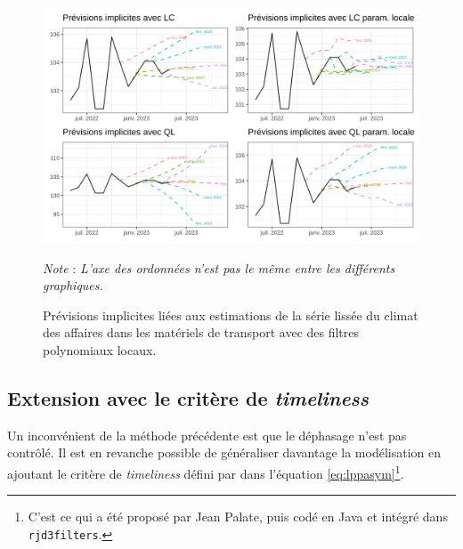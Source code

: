 \documentclass[
  12pt,
  a4paper,french]{article}
\newcommand\1{\mathds{1}}
\begin{document}
\begin{figure}

{\centering \includegraphics[width=1\linewidth]{img/ex/lp_local_if} 

}

\caption[Prévisions implicites liées aux estimations de la série lissée du climat des affaires dans les matériels de transport avec des filtres polynomiaux locaux]{Prévisions implicites liées aux estimations de la série lissée du climat des affaires dans les matériels de transport avec des filtres polynomiaux locaux.}\label{fig:graphs-ex-lploc-if}

\footnotesize


\emph{Note} : \emph{L'axe des ordonnées n'est pas le même entre les différents graphiques.}
\normalsize\end{figure}

\hypertarget{subsec-lptimeliness}{%
\subsection{\texorpdfstring{Extension avec le critère de \emph{timeliness}}{Extension avec le critère de timeliness}}\label{subsec-lptimeliness}}

Un inconvénient de la méthode précédente est que le déphasage n'est pas contrôlé.
Il est en revanche possible de généraliser davantage la modélisation en ajoutant le critère de \emph{timeliness} défini par \textcite{ch15HBSA} dans l'équation \eqref{eq:lppasym}\footnote{
  C'est ce qui a été proposé par Jean Palate, puis codé en Java et intégré dans \texttt{rjd3filters}.}.
\end{document}
